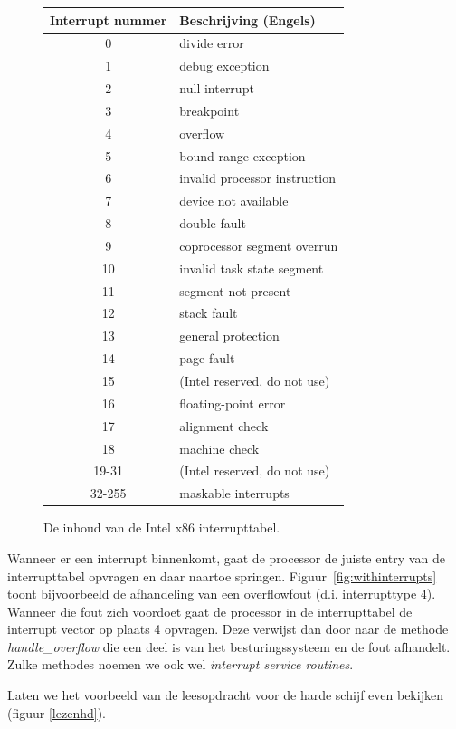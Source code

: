 \begin{figure}
\centering
\begin{tabular}{|c|l|}
  \hline
  \textbf{Interrupt nummer} & \textbf{Beschrijving (Engels)} \\
  \hline
  0 & divide error \\
  1 & debug exception \\
  2 & null interrupt \\
  3 & breakpoint \\
  4 & overflow \\
  5 & bound range exception \\
  6 & invalid processor instruction \\
  7 & device not available \\
  8 & double fault \\
  9 & coprocessor segment overrun \\
  10 & invalid task state segment \\
  11 & segment not present \\
  12 & stack fault \\
  13 & general protection \\
  14 & page fault \\
  15 & (Intel reserved, do not use) \\
  16 & floating-point error \\
  17 & alignment check \\
  18 & machine check \\
  19-31 & (Intel reserved, do not use) \\
  32-255 & maskable interrupts \\
  \hline
\end{tabular}
\caption{De inhoud van de Intel x86 interrupttabel.}
\label{table:ivt}
\end{figure}

Wanneer er een interrupt binnenkomt, gaat de processor de juiste entry van de interrupttabel opvragen en daar naartoe springen. Figuur~\ref{fig:withinterrupts} toont bijvoorbeeld de afhandeling van een overflowfout (d.i. interrupttype 4). Wanneer die fout zich voordoet gaat de processor in de interrupttabel de interrupt vector op plaats 4 opvragen. Deze verwijst dan door naar de methode \emph{handle\_overflow} die een deel is van het besturingssysteem en de fout afhandelt. Zulke methodes noemen we ook wel \emph{interrupt service routines}.

Laten we het voorbeeld van de leesopdracht voor de harde schijf
even bekijken (figuur \ref{lezenhd}).

